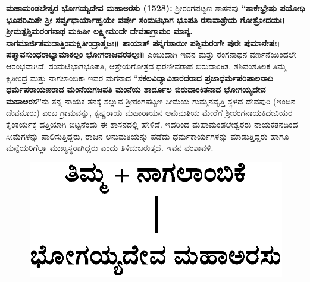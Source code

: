 \textbf{ಮಹಾಮಂಡಲೇಶ್ವರ ಭೋಗಯ್ಯದೇವ ಮಹಾಅರಸು (1528):} ಶ‍್ರೀರಂಗಪಟ್ಟಣ ಶಾಸನವು \textbf{“ಶಾಕೇಭ್ರೇಷು ಪಯೋಧಿ ಭೂಪರಿಮಿತೇ ಶ‍್ರೀ ಸರ್ವ್ವಧಾರ್ಯಾಹ್ವಯೇ ವರ್ಷೇ ಸಂಮಟಿಭಾಗ ಭೂಪತಿ ರಸಾವಾತ್ರೇಯ ಗೋತ್ರೋದಯಃ। ಶ‍್ರೀಮತ್ಪಶ್ಚಿಮರಂಗನಾಥ ಮಹಿಷೀ ಲಕ್ಷ್ಮೀಮುದೇ ದೇವತಾಗ್ರಾಮಂ ಮಾನ್ಯ. ನಾಗಮಾರ್ಜಿತಮದಾತ್ತಿಂಮಕ್ಷಿತೀಂದ್ರಾತ್ಮಜಃ॥ ಪಾಯಾತ್​ ಪನ್ನಗಶಾಯೀ ಪಶ್ಚಿಮರಂಗೇ ಪುರಃ ಪುಮಾನೇಷಃ। ಪತ್ಮಾವಸುಂಧರಾಭ್ಯಾಮಾಕಲ್ಪಂ ಭೋಗರಾಜವರತಲ್ಪಃ॥} ಎಂಬುದಾಗಿ ಇವನ ಮತ್ತು ರಂಗನಾಥನ ವರ್ಣನೆಯಿಂದಲೇ ಆರಂಭವಾಗಿದೆ. ಸಂಮಟಿಭಾಗಭೂಪತಿ, ಆತ್ರೇಯಗೋತ್ರದ ಧರಣೀವರಾಹ ಬಿರುದಾಂಕಿತ, ಶಶಿವಂಶತಿಲಕ ತಿಮ್ಮ ಕ್ಷಿತೀಂದ್ರ ಮತ್ತು ನಾಗಲಾಂಬಿಕಾ ಇವರ ಮಗನಾದ “\textbf{ಸಕಲವಿದ್ಯಾವಿಶಾರದ\-ರಾದ ಪ್ರಜಾಧರ್ಮಪರಿಪಾಲನಾದಿ ಧರ್ಮಪರಾಯಣರಾದ ಮಂನೆಯಗಜಪತಿ ಮಂನೆಯ ಶಾರ್ದೂಲ ಬಿರುದಾಂಕಿತನಾದ\general{\break } ಭೋಗಯ್ಯದೇವ ಮಹಾಅರಸ”}ನು ತನ್ನ ನಾಯಕ ತನಕ್ಕೆ ಸಲ್ಲುವ ಶ‍್ರೀರಂಗಪಟ್ಟಣ ಸೀಮೆಯ ಗುಮ್ಮನವೃತ್ತಿ ಸ್ಥಳದ ದೇವಪುರಿ (ಇಂದಿನ ದೇವನೂರು) ಎಂಬ ಗ್ರಾಮವನ್ನು, ಕೃಷ್ಣರಾಯ ಮಹಾರಾಯನ ಅನುಮತಿಯ ಮೇರೆಗೆ ಶ‍್ರೀರಂಗನಾಯಕಿದೇವಿಯರ ಕೈಂಕರ್ಯಕ್ಕೆ ದತ್ತಿಯಾಗಿ ಬಿಟ್ಟನೆಂದು ಈ ಶಾಸನದಲ್ಲಿ ಹೇಳಿದೆ. ಇದರಿಂದ ಮಹಾಮಂಡಲೇಶ್ವರರು ನಾಯಕತನದಿಂದ ಸೀಮೆಗಳನ್ನು ಪಾಲಿಸುತ್ತಿದ್ದರು, ರಾಜನ ಅನುಮತಿಯನ್ನು ಪಡೆದು ಧರ್ಮಕಾರ್ಯಗಳನ್ನು ಮಾಡುತ್ತಿದ್ದರು ಹಾಗೂ ಮನ್ನೆಯರಿ\-ಗೆಲ್ಲಾ ಮುಖ್ಯಸ್ಥರಾಗಿದ್ದರು ಎಂದು ತಿಳಿದುಬರುತ್ತದೆ. ಇವನ ವಂಶಾವಳಿ.
\begin{figure}[H]
\includegraphics[scale=1.1]{images/chap3/chap3fig39.jpeg}
\end{figure}

